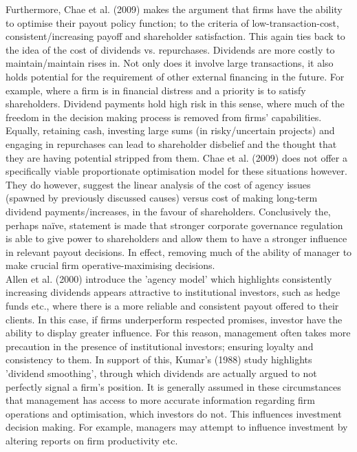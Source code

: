 \documentclass[11pt, english]{article}
\begin{document}
	Furthermore, Chae et al. (2009) makes the argument that firms have the ability to optimise their payout policy function; to the criteria of low-transaction-cost, consistent/increasing payoff and shareholder satisfaction. This again ties back to the idea of the cost of dividends vs. repurchases. Dividends are more costly to maintain/maintain rises in. Not only does it involve large transactions, it also holds potential for the requirement of other external financing in the future. For example, where a firm is in financial distress and a priority is to satisfy shareholders. Dividend payments hold high risk in this sense, where much of the freedom in the decision making process is removed from firms' capabilities. Equally, retaining cash, investing large sums (in risky/uncertain projects) and engaging in repurchases can lead to shareholder disbelief and the thought that they are having potential stripped from them. Chae et al. (2009) does not offer a specifically viable proportionate optimisation model for these situations however. They do however, suggest the linear analysis of the cost of agency issues (spawned by previously discussed causes) versus cost of making long-term dividend payments/increases, in the favour of shareholders. Conclusively the, perhaps na\"{i}ve, statement is made that stronger corporate governance regulation is able to give power to shareholders and allow them to have a stronger influence in relevant payout decisions. In effect, removing much of the ability of manager to make crucial firm operative-maximising decisions.\\

	Allen et al. (2000) introduce the 'agency model' which highlights consistently increasing dividends appears attractive to institutional investors, such as hedge funds etc., where there is a more reliable and consistent payout offered to their clients. In this case, if firms underperform respected promises, investor have the ability to display greater influence. For this reason, management often takes more precaution in the presence of institutional investors; ensuring loyalty and consistency to them. In support of this, Kumar's (1988) study highlights 'dividend smoothing', through which dividends are actually argued to not perfectly signal a firm's position. It is generally assumed in these circumstances that management has access to more accurate information regarding firm operations and optimisation, which investors do not. This influences investment decision making. For example, managers may attempt to influence investment by altering reports on firm productivity etc.\\
\end{document}
